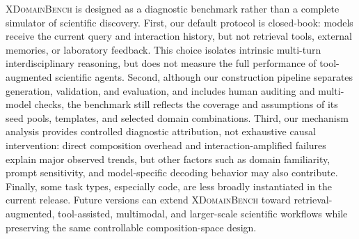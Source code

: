 \textsc{XDomainBench} is designed as a diagnostic benchmark rather than a complete simulator of scientific discovery. 
First, our default protocol is closed-book: models receive the current query and interaction history, but not retrieval tools, external memories, or laboratory feedback. 
This choice isolates intrinsic multi-turn interdisciplinary reasoning, but does not measure the full performance of tool-augmented scientific agents. 
Second, although our construction pipeline separates generation, validation, and evaluation, and includes human auditing and multi-model checks, the benchmark still reflects the coverage and assumptions of its seed pools, templates, and selected domain combinations. 
Third, our mechanism analysis provides controlled diagnostic attribution, not exhaustive causal intervention: direct composition overhead and interaction-amplified failures explain major observed trends, but other factors such as domain familiarity, prompt sensitivity, and model-specific decoding behavior may also contribute. 
Finally, some task types, especially code, are less broadly instantiated in the current release. 
Future versions can extend \textsc{XDomainBench} toward retrieval-augmented, tool-assisted, multimodal, and larger-scale scientific workflows while preserving the same controllable composition-space design.